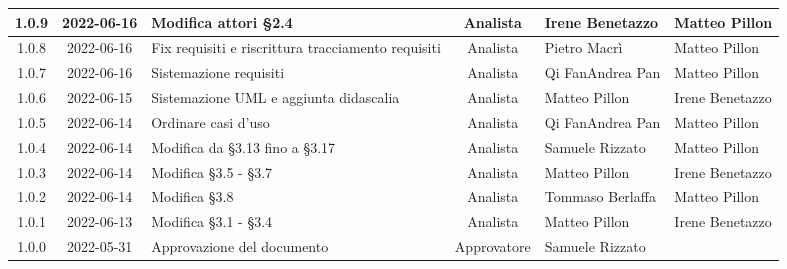 \begin{center}
\begin{longtable}{ |c|c|p{8em}|c|m{5em}|m{5em}| }
	\hline
	1.0.9 & 2022-06-16 & Modifica attori §2.4 & Analista & Irene \newline Benetazzo & Matteo \newline Pillon\\
	\hline
	1.0.8 & 2022-06-16 & Fix requisiti e riscrittura tracciamento requisiti & Analista & Pietro \newline Macrì & Matteo \newline Pillon\\
	\hline
	1.0.7 & 2022-06-16 & Sistemazione requisiti & Analista & Qi Fan\newline Andrea Pan & Matteo \newline Pillon\\
	\hline
	1.0.6 & 2022-06-15 & Sistemazione UML \newline e aggiunta didascalia  & Analista & Matteo \newline Pillon & Irene \newline Benetazzo \\
	\hline
	1.0.5 & 2022-06-14 & Ordinare casi d'uso  & Analista & Qi Fan\newline Andrea Pan & Matteo \newline Pillon \\
	\hline
	1.0.4 & 2022-06-14 & Modifica da §3.13 \newline fino a §3.17 & Analista & Samuele	\newline Rizzato & Matteo \newline Pillon\\
	\hline
	1.0.3 & 2022-06-14 & Modifica \newline §3.5 - §3.7 & Analista & Matteo	\newline Pillon & Irene \newline Benetazzo\\
  	\hline
	1.0.2 & 2022-06-14 & Modifica \newline §3.8 & Analista & Tommaso	\newline Berlaffa & Matteo \newline Pillon\\
  	\hline
	1.0.1 & 2022-06-13 & Modifica \newline §3.1 - §3.4 & Analista & Matteo	\newline Pillon & Irene \newline Benetazzo\\
	\hline
	1.0.0 & 2022-05-31 & Approvazione del documento & Approvatore & Samuele \newline Rizzato & \\

\end{longtable}
\end{center}
